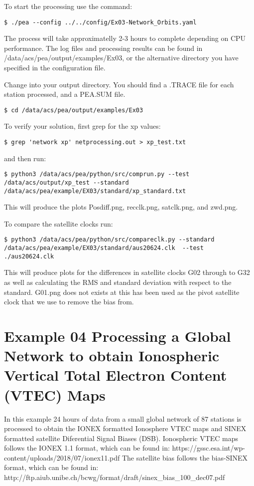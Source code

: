 To start the processing use the command:
\begin{lstlisting}
$ ./pea --config ../../config/Ex03-Network_Orbits.yaml
\end{lstlisting}
The process will take approximatelly 2-3 hours to complete depending on CPU performance. The log files and processing results can be found in /data/acs/pea/output/examples/Ex03, or the alternative directory you have specified in the configuration file.

Change into your output directory. You should find a .TRACE file for each station processed, and a PEA.SUM file.
\begin{lstlisting}
$ cd /data/acs/pea/output/examples/Ex03
\end{lstlisting}
To verify your solution, first grep for the xp values:
\begin{lstlisting}
$ grep 'network xp' netprocessing.out > xp_test.txt
\end{lstlisting}
and then run:
\begin{lstlisting}
$ python3 /data/acs/pea/python/src/comprun.py --test /data/acs/output/xp_test --standard /data/acs/pea/example/EX03/standard/xp_standard.txt
\end{lstlisting}
This will produce the plots Posdiff.png, recclk.png, satclk.png, and zwd.png.

To compare the satellite clocks run:
\begin{lstlisting}
$ python3 /data/acs/pea/python/src/compareclk.py --standard /data/acs/pea/example/EX03/standard/aus20624.clk  --test ./aus20624.clk
\end{lstlisting}
This will produce plots for the differences in satellite clocks G02 through to G32 as well as calculating the RMS and standard deviation with respect to the standard. G01.png does not exists at this has been used as the pivot satellite clock that we use to remove the bias from.

\section{Example 04 Processing a Global Network to obtain Ionospheric Vertical Total Electron Content (VTEC) Maps}
In this example 24 hours of data from a small global network of 87 stations is processed to obtain the IONEX formatted Ionosphere VTEC maps and SINEX formatted satellite Diferential Signal Biases (DSB). 
Ionospheric VTEC maps follows the IONEX 1.1 format, which can be found in: https://gssc.esa.int/wp-content/uploads/2018/07/ionex11.pdf 
The satellite bias follows the bias-SINEX format, which can be found in: http://ftp.aiub.unibe.ch/bcwg/format/draft/sinex\_bias\_100\_dec07.pdf

